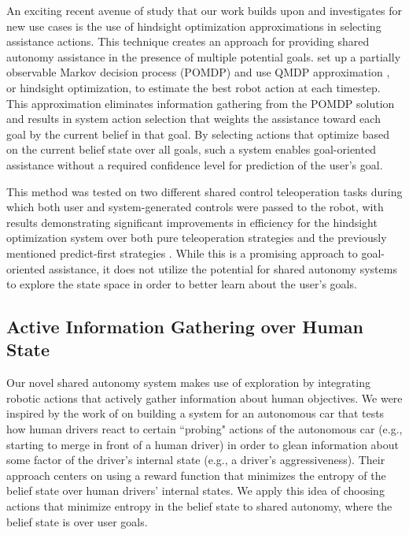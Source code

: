 \documentclass[conference]{IEEEtran}
\begin{document}
An exciting recent avenue of study that our work builds upon and investigates for new use cases is the use of hindsight optimization approximations in selecting assistance actions. This technique creates an approach for providing shared autonomy assistance in the presence of multiple potential goals. \citet{javdani2015shared} set up a partially observable Markov decision process (POMDP) and use QMDP approximation \cite{littman1995learning}, or hindsight optimization, to estimate the best robot action at each timestep. This approximation eliminates information gathering from the POMDP solution and results in system action selection that weights the assistance toward each goal by the current belief in that goal. By selecting actions that optimize based on the current belief state over all goals, such a system enables goal-oriented assistance without a required confidence level for prediction of the user's goal. 

This method was tested on two different shared control teleoperation tasks during which both user and system-generated controls were passed to the robot, with results demonstrating significant improvements in efficiency for the hindsight optimization system over both pure teleoperation strategies and the previously mentioned predict-first strategies \cite{javdani2018shared}. While this is a promising approach to goal-oriented assistance, it does not utilize the potential for shared autonomy systems to explore the state space in order to better learn about the user's goals.

\subsection{Active Information Gathering over Human State}
Our novel shared autonomy system makes use of exploration by integrating robotic actions that actively gather information about human objectives. We were inspired by the work of \citet{sadigh2016information} on building a system for an autonomous car that tests how human drivers react to certain ``probing" actions of the autonomous car (e.g., starting to merge in front of a human driver) in order to glean information about some factor of the driver's internal state (e.g., a driver's aggressiveness). Their approach centers on using a reward function that minimizes the entropy of the belief state over human drivers' internal states. We apply this idea of choosing actions that minimize entropy in the belief state to shared autonomy, where the belief state is over user goals.
\end{document}
